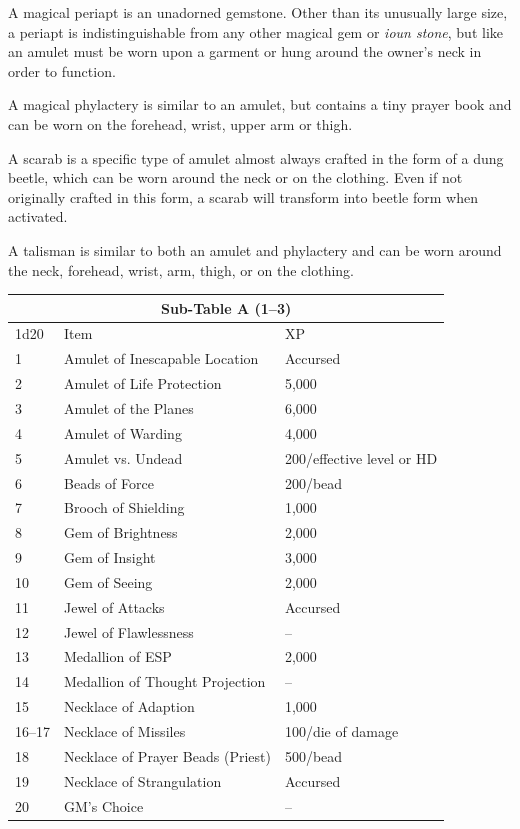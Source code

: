 \begin{multicols}{2}
A magical periapt is an unadorned gemstone.  Other than its unusually large size, a periapt is indistinguishable from any other magical gem or \textit{ioun stone}, but like an amulet must be worn upon a garment or hung around the owner's neck in order to function.

A magical phylactery is similar to an amulet, but contains a tiny prayer book and can be worn on the forehead, wrist, upper arm or thigh. 

A scarab is a specific type of amulet almost always crafted in the form of a dung beetle, which can be worn around the neck or on the clothing.  Even if not originally crafted in this form, a scarab will transform into beetle form when activated.

A talisman is similar to both an amulet and phylactery and can be worn around the neck, forehead, wrist, arm, thigh, or on the clothing.

\noindent
\begin{minipage}{\columnwidth}

\label{jewelsa}
\noindent
\begin{tabular}{|p{}|p{}|p{}|}
\multicolumn{3}{c}{Sub-Table A (1--3)} \\
\hline
1d20	& Item	& XP \\
\hline\hline
\rowcolor[gray]{.9}1	& Amulet of Inescapable Location	& Accursed \\
2	& Amulet of Life Protection	& 5,000 \\
\rowcolor[gray]{.9}3	& Amulet of the Planes	& 6,000 \\
4	& Amulet of Warding	& 4,000 \\
\rowcolor[gray]{.9}5	& Amulet vs. Undead	& 200/effective level or HD \\
6	& Beads of Force	& 200/bead \\
\rowcolor[gray]{.9}7	& Brooch of Shielding	& 1,000 \\
8	& Gem of Brightness	& 2,000 \\
\rowcolor[gray]{.9}9	& Gem of Insight	& 3,000 \\
10	& Gem of Seeing	& 2,000 \\
\rowcolor[gray]{.9}11	& Jewel of Attacks	& Accursed \\
12	& Jewel of Flawlessness	& -- \\
\rowcolor[gray]{.9}13	& Medallion of ESP	& 2,000 \\
14	& Medallion of Thought Projection	& -- \\
\rowcolor[gray]{.9}15	& Necklace of Adaption	& 1,000 \\
16--17	& Necklace of Missiles	& 100/die of damage \\
\rowcolor[gray]{.9}18	& Necklace of Prayer Beads (Priest)	& 500/bead \\
19	& Necklace of Strangulation	& Accursed \\
\rowcolor[gray]{.9}20	& GM's Choice	& -- \\
\hline
\end{tabular}


\end{minipage}
\end{multicols}
